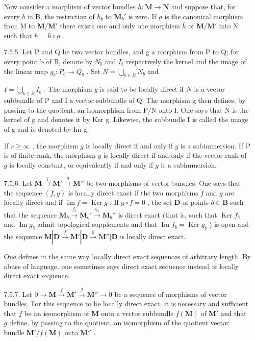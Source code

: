 Now consider a morphism of vector bundles \(h: \mathbf{M} \to \mathbf{N}\) and suppose that, for every \(b\) in B, the restriction of \(h_b\) to \(\mathbf{M}_b'\) is zero. If \(\rho\) is the canonical morphism from M to \(\mathbf{M}/\mathbf{M}'\) there exists one and only one morphism \(\bar{h}\) of \(\mathbf{M}/\mathbf{M}'\) into N such that \(h = \bar{h} \circ \rho\) .

7.5.5. Let P and Q be two vector bundles, and g a morphism from P to Q; for every point b of B, denote by \(N_{b}\) and \(I_{b}\) respectively the kernel and the image of the linear map \(g_{b}:P_{b}\to Q_{b}\) . Set \(N=\bigcup_{b\in B}N_{b}\) and

\(I = \bigcup_{b \in B} I_b\) . The morphism \(g\) is said to be locally direct if \(N\) is a vector subbundle of P and I a vector subbundle of Q. The morphism g then defines, by passing to the quotient, an isomorphism from P/N onto I. One says that N is the kernel of g and denotes it by Ker g. Likewise, the subbundle I is called the image of g and is denoted by Im g.

If \(r \geqslant \infty\) , the morphism \(g\) is locally direct if and only if \(g\) is a subimmersion. If P is of finite rank, the morphism \(g\) is locally direct if and only if the vector rank of \(g\) is locally constant, or equivalently if and only if \(g\) is a subimmersion.

7.5.6. Let \(\mathbf{M} \xrightarrow{f} \mathbf{M}' \xrightarrow{g} \mathbf{M}''\) be two morphisms of vector bundles. One says that the sequence \((f, g)\) is locally direct exact if the two morphisms \(f\) and \(g\) are locally direct and if \(\operatorname{Im} f = \operatorname{Ker} g\) . If \(g \circ f = 0\) , the set \(\mathbf{D}\) of points \(b \in \mathbf{B}\) such that the sequence \(\mathbf{M}_b \xrightarrow{f_b} \mathbf{M}_b' \xrightarrow{g_b} \mathbf{M}_b''\) is direct exact (that is, such that \(\operatorname{Ker} f_b\) and \(\operatorname{Im} g_b\) admit topological supplements and that \(\operatorname{Im} f_b = \operatorname{Ker} g_b\) ) is open and the sequence \(\mathbf{M}|\mathbf{D} \xrightarrow{f} \mathbf{M}'|\mathbf{D} \xrightarrow{g} \mathbf{M}''|\mathbf{D}\) is locally direct exact.

One defines in the same way locally direct exact sequences of arbitrary length. By abuse of language, one sometimes says direct exact sequence instead of locally direct exact sequence.

7.5.7. Let \(0 \to \mathbf{M} \xrightarrow{f} \mathbf{M}' \xrightarrow{g} \mathbf{M}'' \to 0\) be a sequence of morphisms of vector bundles. For this sequence to be locally direct exact, it is necessary and sufficient that \(f\) be an isomorphism of \(\mathbf{M}\) onto a vector subbundle \(f(\mathbf{M})\) of \(\mathbf{M}'\) and that \(g\) define, by passing to the quotient, an isomorphism of the quotient vector bundle \(\mathbf{M}'/f(\mathbf{M})\) onto \(\mathbf{M}''\) .

